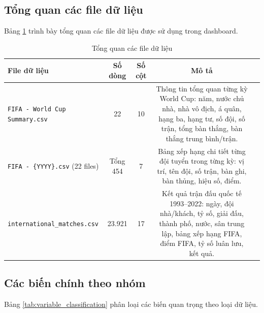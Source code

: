 \documentclass[12pt,a4paper]{article}
\begin{document}
\subsection{Tổng quan các file dữ liệu}
Bảng \ref{tab:data_files} trình bày tổng quan các file dữ liệu được sử dụng trong dashboard.

\begin{table}[H]
\centering
\caption{Tổng quan các file dữ liệu}
\label{tab:data_files}
\begin{tabular}{lcccp{7.5cm}}
\toprule
\textbf{File dữ liệu} & \textbf{Số dòng} & \textbf{Số cột} & \textbf{Mô tả} \\
\midrule
\texttt{FIFA - World Cup Summary.csv} & 22 & 10 & Thông tin tổng quan từng kỳ World Cup: năm, nước chủ nhà, nhà vô địch, á quân, hạng ba, hạng tư, số đội, số trận, tổng bàn thắng, bàn thắng trung bình/trận. \\
\texttt{FIFA - \{YYYY\}.csv} (22 files) & Tổng 454 & 7 & Bảng xếp hạng chi tiết từng đội tuyển trong từng kỳ: vị trí, tên đội, số trận, bàn ghi, bàn thủng, hiệu số, điểm. \\
\texttt{international\_matches.csv} & 23.921 & 17 & Kết quả trận đấu quốc tế 1993--2022: ngày, đội nhà/khách, tỷ số, giải đấu, thành phố, nước, sân trung lập, bảng xếp hạng FIFA, điểm FIFA, tỷ số luân lưu, kết quả. \\
\bottomrule
\end{tabular}
\end{table}

\subsection{Các biến chính theo nhóm}
Bảng \ref{tab:variable_classification} phân loại các biến quan trọng theo loại dữ liệu.
\end{document}
